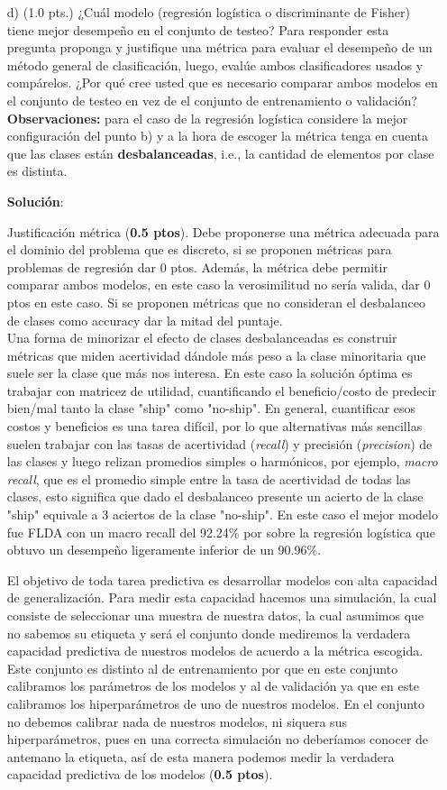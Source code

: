 \documentclass[11pt,letterpaper]{article}
\begin{document}
\begin{enumerate}
\item[d)] (1.0 pts.) ¿Cuál modelo (regresión logística o  discriminante de Fisher) tiene mejor desempeño en el conjunto de testeo? Para responder esta pregunta proponga y justifique una métrica para evaluar el desempeño de un método general de clasificación, luego, evalúe ambos clasificadores usados y compárelos. ¿Por qué cree usted que es necesario comparar ambos modelos en el conjunto de testeo en vez de el conjunto de entrenamiento o validación?
\\\textbf{Observaciones:} para el caso de la regresión logística considere la mejor configuración del punto b) y a la hora de escoger la métrica tenga en cuenta que las clases están \textbf{desbalanceadas}, i.e., la cantidad de elementos por clase es distinta.

\textbf{Solución}:

Justificación métrica (\textbf{0.5 ptos}). Debe proponerse una métrica adecuada para el dominio del problema que es discreto, si se proponen métricas para problemas de regresión dar 0 ptos. Además, la métrica debe permitir comparar ambos modelos, en este caso la verosimilitud no sería valida, dar 0 ptos en este caso. Si se proponen métricas que no consideran el desbalanceo de clases como accuracy dar la mitad del puntaje.\\ 

Una forma de minorizar el efecto de clases desbalanceadas es construir métricas que miden acertividad dándole más peso a la clase minoritaria que suele ser la clase que más nos interesa. En este caso la solución óptima es trabajar con matricez de utilidad, cuantificando el beneficio/costo de predecir bien/mal tanto la clase "ship" como "no-ship". En general, cuantificar esos costos y beneficios es una tarea difícil, por lo que alternativas más sencillas suelen trabajar con las tasas de acertividad (\textit{recall}) y precisión (\textit{precision}) de las clases y luego relizan promedios simples o harmónicos, por ejemplo, \textit{macro recall}, que es el promedio simple entre la tasa de acertividad de todas las clases, esto significa que dado el desbalanceo presente un acierto de la clase "ship" equivale a 3 aciertos de la clase "no-ship". En este caso el mejor modelo fue FLDA con un macro recall del 92.24\% por sobre la regresión logística que obtuvo un desempeño ligeramente inferior de un 90.96\%. 

El objetivo de toda tarea predictiva es desarrollar modelos con alta capacidad de generalización. Para medir esta capacidad hacemos una simulación, la cual consiste de seleccionar una muestra de nuestra datos, la cual asumimos que no sabemos su etiqueta y será el conjunto donde mediremos la verdadera capacidad predictiva de nuestros modelos de acuerdo a la métrica escogida. Este conjunto es distinto al de entrenamiento por que en este conjunto calibramos los parámetros de los modelos y al de validación ya que en este calibramos los hiperparámetros de uno de nuestros modelos. En el conjunto no debemos calibrar nada de nuestros modelos, ni siquera sus hiperparámetros, pues en una correcta simulación no deberíamos conocer de antemano la etiqueta, así de esta manera podemos medir la verdadera capacidad predictiva de los modelos (\textbf{0.5 ptos}).



\end{enumerate}
\end{document}
